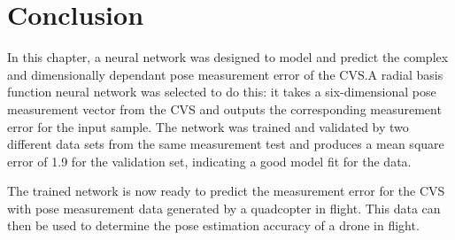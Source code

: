 \section{Conclusion}

In this chapter, a neural network was designed to model and predict the complex and dimensionally dependant pose measurement error of the CVS.\@ A radial basis function neural network was selected to do this: it takes a six-dimensional pose measurement vector from the CVS and outputs the corresponding measurement error for the input sample. The network was trained and validated by two different data sets from the same measurement test and produces a mean square error of 1.9 for the validation set, indicating a good model fit for the data. 

The trained network is now ready to predict the measurement error for the CVS with pose measurement data generated by a quadcopter in flight. This data can then be used to determine the pose estimation accuracy of a drone in flight. 
